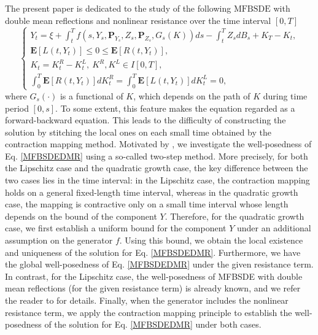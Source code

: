\documentclass[10pt]{article}%
\numberwithin{equation}{section}
\begin{document}
The present paper is dedicated to the study of the following $\text{MFBSDE}$ with double mean reflections and nonlinear resistance over the time interval $[0,T]$ 
\begin{equation}\label{MFBSDEDMR}
\begin{cases}
Y_t=\xi+\int_t^T f(s,Y_s,\mathbf{P}_{Y_s},Z_s,\mathbf{P}_{Z_s},G_s(K))ds-\int_t^T Z_s dB_s+K_T-K_t, \\
\mathbf{E}[L(t,Y_t)]\leq 0\leq \mathbf{E}[R(t,Y_t)], \\
K_t=K^R_t-K^L_t,\ K^R,K^L\in I[0,T], \\
\int_0^T \mathbf{E}[R(t,Y_t)]dK_t^R=\int_0^T \mathbf{E}[L(t,Y_t)]dK^L_t=0,
\end{cases}
\end{equation}
where $G_s(\cdot)$ is a functional of $K$, which depends on the path of $K$ during time period $[0,s]$. To some extent, this feature makes the equation regarded as a forward-backward equation. This leads to the difficulty of constructing the solution by stitching the local ones on each small time obtained by the contraction mapping method. Motivated by \cite{LP}, we investigate the well-posedness of Eq. \eqref{MFBSDEDMR} using a so-called two-step method. More precisely, for both the Lipschitz case and the quadratic growth case, the key difference between the two cases lies in the time interval: in the Lipschitz case, the contraction mapping holds on a general fixed-length time interval, whereas in the quadratic growth case, the mapping is contractive only on a small time interval whose length depends on the bound of the component $Y$. Therefore, for the quadratic growth case, we first establish a uniform bound for the component $Y$ under an additional assumption on the generator $f$. Using this bound, we obtain the local existence and uniqueness of the solution for Eq. \eqref{MFBSDEDMR}. Furthermore, we have the global well-posedness of Eq. \eqref{MFBSDEDMR} under the given resistance term.
In contrast, for the Lipschitz case, the well-posedness of MFBSDE with double mean reflections (for the given resistance term) is already known, and we refer the reader to \cite{LS} for details. Finally, when the generator includes the nonlinear resistance term, we apply the contraction mapping principle to establish the well-posedness of the solution for Eq. \eqref{MFBSDEDMR} under both cases.
\end{document}
